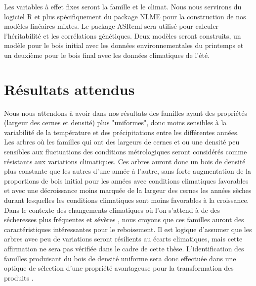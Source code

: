 \documentclass{report}
\begin{document}
 Les variables à effet fixes seront la famille et le climat. Nous nous servirons du logiciel R \citep{R2018} et plus spécifiquement du package NLME \citep{NLME2018} pour la construction de nos modèles linéaires mixtes. Le package ASReml sera utilisé pour calculer l'héritabilité et les corrélations génétiques. Deux modèles seront construits, un modèle pour le bois initial avec les données environnementales du printemps et un deuxième pour le bois final avec les données climatiques de l'été.
 

\section*{Résultats attendus}

Nous nous attendons à avoir dans nos résultats des familles ayant des propriétés (largeur des cernes et densité) plus "uniformes", donc moins sensibles à la variabilité de la  température et des précipitations entre les différentes années.\\ 

Les arbres où les familles qui ont des largeurs de cernes et ou une densité peu sensibles aux fluctuations des conditions métrologiques seront considérés comme résistants aux variations climatiques. Ces arbres auront donc un bois de densité plus constante que les autres d'une année à l'autre, sans forte augmentation de la proportions de bois initial pour les années avec conditions climatiques favorables et avec une décroissance moins marquée de la largeur des cernes les années sèches durant lesquelles les conditions climatiques sont moins favorables à la croissance. Dans le contexte des changements climatiques où l'on s'attend à de des sécheresses plus fréquentes et sévères \citep{IPCC_2015}, nous croyons que ces familles auront des caractéristiques intéressantes pour le reboisement. Il est logique d'assumer que les arbres avec peu de variations seront résilients au écarts climatiques, mais cette affirmation ne sera pas vérifiée dans le cadre de cette thèse. L'identification des familles produisant du bois de densité uniforme sera donc effectuée dans une optique de sélection d'une propriété avantageuse pour la transformation des produits \citep{Hernandez2001}. \\ %
\end{document}
